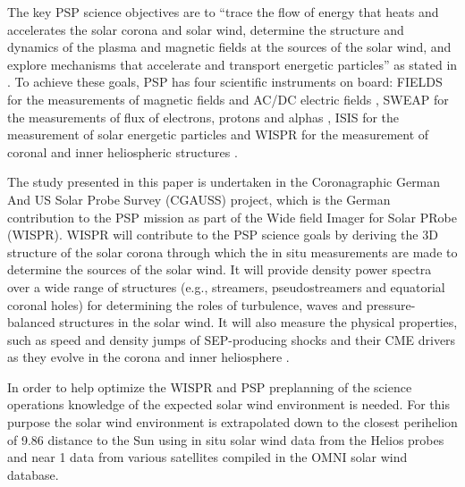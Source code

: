 The key PSP science objectives are to “trace the flow of energy that heats and accelerates the solar corona and solar wind, determine the structure and dynamics of the plasma and magnetic fields at the sources of the solar wind, and explore mechanisms that accelerate and transport energetic particles” as stated in \citet{Fox2015}. To achieve these goals, PSP has four scientific instruments on board: FIELDS for the measurements of magnetic fields and AC/DC electric fields \citep{Bale2016}, SWEAP for the measurements of flux of electrons, protons and alphas \citep{Kasper2016}, IS\sun{}IS for the measurement of solar energetic particles \citep{McComas2016} and WISPR for the measurement of coronal and inner heliospheric structures \citep{Vourlidas2016}.

The study presented in this paper is undertaken in the Coronagraphic German And US Solar Probe Survey (CGAUSS) project, which is the German contribution to the PSP mission as part of the Wide field Imager for Solar PRobe (WISPR). WISPR will contribute to the PSP science goals by deriving the 3D structure of the solar corona through which the in situ measurements are made to determine the sources of the solar wind. It will provide density power spectra over a wide range of structures (e.g., streamers, pseudostreamers and equatorial coronal holes) for determining the roles of turbulence, waves and pressure-balanced structures in the solar wind. It will also measure the physical properties, such as speed and density jumps of SEP-producing shocks and their CME drivers as they evolve in the corona and inner heliosphere \citep{Vourlidas2016}.

In order to help optimize the WISPR and PSP preplanning of the science operations knowledge of the expected solar wind environment is needed. For this purpose the solar wind environment is extrapolated down to the closest perihelion of \SI{9.86}{\Rs} distance to the Sun using in situ solar wind data from the Helios probes and near \SI{1}{\au} data from various satellites compiled in the OMNI solar wind database.


